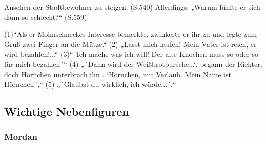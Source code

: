 Ansehen der Stadtbewohner zu steigen. (S.540) Allerdings: „Warum fühlte er sich dann so schlecht?“ (S.559)


(1)“Als er Mohnschneckes Interesse bemerkte, zwinkerte er ihr zu und legte zum Gruß zwei Finger an die Mütze.“
(2) „Lasst mich laufen! Mein Vater ist reich, er wird bezahlen!...“
(3)“´Ich mache was ich will! Der alte Knochen muss so oder so für mich bezahlen´“
(4) „´Dann wird der Weißbrotbursche...`, begann der Richter, doch Hörnchen unterbrach ihn . `Hörnchen, mit Verlaub. Mein Name ist Hörnchen´,“
(5) „´Glaubst du wirklich, ich würde...´,“

\subsection{Wichtige Nebenfiguren}
\subsubsection{Mordan}
